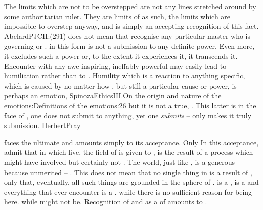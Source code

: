 The limits which are not to be overstepped are not any  lines
stretched around by some authoritarian ruler. They are limits of 
as such, the  limits which are impossible to overstep anyway, and
 is simply an accepting recognition of this fact.
\citet{Humility is that whereby we refrain from the desire for empty glory, so
that we don't desire to seem more than we are.}{AbelardPJC}{II:(291)}
 does not mean that  recognise any particular master who
is governing  or .  in this 
form is not a submission to any definite power. Even more, it excludes such a
power or, to the extent it experiences it, it transcends it.  Encounter with any
awe inspiring, ineffably powerful  may easily lead to
humiliation rather than to . Humility which is a reaction to
anything specific, which is caused by no matter how , but still a
particular cause or power, is perhaps an emotion, \citet{the sorrow produced by
contemplating our impotence or helplessness,}{SpinozaEthics}{III.On the origin
and nature of the emotions:Definitions of the emotions:26} but it is not a
true, . This latter is 
 in the face of , one does not submit to anything,
yet one {\em submits} -- only  makes it truly 
submission.  \citet{Let me be humble, that is, one who thirsts for the
origin.}{HerbertPray}{}

\label{thankfulnes}
  faces the ultimate  and amounts simply to its
acceptance. Only 
{} In this acceptance,  admit that  in which  live, 
the field of  is given to , is the 
result of a process which might have involved  but 
certainly not . The world, just like , is a generous --
because unmerited -- . %
This does not mean that no single 
thing in  is a result of , only that, 
eventually, all such things are grounded in the 
 sphere of .  is a 
,  is a  and everything that  ever 
encounter is a .  while there is no sufficient 
reason for  being here.  while  might not be. 
Recognition of  and  as a  of 
 amounts to .

